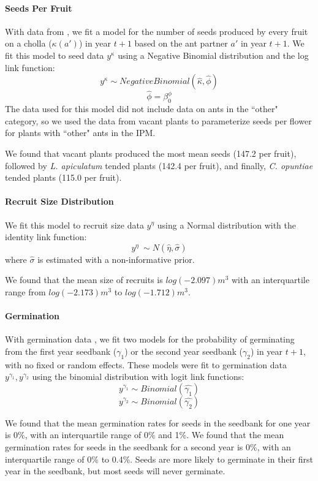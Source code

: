 \documentclass[11pt]{article}
\begin{document}
\paragraph{Seeds Per Fruit}
With data from \cite{Miller2006}, we fit a model for the number of seeds produced by every fruit on a cholla ($\kappa(a')$) in year $t+1$ based on the ant partner $a'$ in year $t+1$.
We fit this model to seed data $y^{\kappa}$ using a Negative Binomial distribution and the log link function: 
$$y^{\kappa} \sim  Negative Binomial(\hat{\kappa},\hat{\phi})$$
$$\hat{\phi} = \beta_{0}^{\phi}$$
The data used for this model did not include data on ants in the ``other" category, so we used the data from vacant plants to parameterize seeds per flower for plants with ``other" ants in the IPM.

We found that vacant plants produced the most mean seeds (147.2 per fruit), followed by \textit{L. apiculatum} tended plants (142.4 per fruit), and finally, \textit{C. opuntiae} tended plants (115.0 per fruit).


\paragraph{Recruit Size Distribution}
We fit this model to recruit size data $y^{\eta}$ using a Normal distribution with the identity link function: 
$$y^{\eta} ~\sim N(\hat{\eta},\hat{\sigma})$$
where $\hat{\sigma}$ is estimated with a non-informative prior. 

We found that the mean size of recruits is $log(-2.097) m^3$ with an interquartile range from $log(-2.173) m^3$ to $log(-1.712) m^3$.



\paragraph{Germination}
With germination data \cite{Miller2007}, we fit two models for the probability of germinating from the first year seedbank ($\gamma_1$) or the second year seedbank ($\gamma_2$) in year $t+1$, with no fixed or random effects.
These models were fit to germination data $y^{\gamma_1}, y^{\gamma_2}$  using the binomial distribution with logit link functions:
$$y^{\gamma_1} \sim Binomial(\hat{\gamma_1})$$
$$y^{\gamma_2} \sim Binomial(\hat{\gamma_2})$$

We found that the mean germination rates for seeds in the seedbank for one year  is 0\%, with an interquartile range of 0\% and 1\%.
We found that the mean germination rates for seeds in the seedbank for a second year is 0\%, with an interquartile range of 0\% to 0.4\%.
Seeds are more likely to germinate in their first year in the seedbank, but most seeds will never germinate. 
\end{document}
